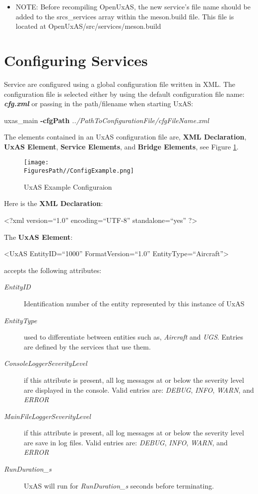 \begin{itemize}
\tightlist
\item
  NOTE: Before recompiling OpenUxAS, the new service's file name should
  be added to the srcs\_services array within the meson.build file. This
  file is located at OpenUxAS/src/services/meson.build
\end{itemize}

\section{Configuring Services}\label{configuring-services}

Service are configured using a global configuration file written in XML.
The configuration file is selected either by using the default
configuration file name: \textbf{\emph{cfg.xml}} or passing in the
path/filename when starting UxAS:

uxas\_main \textbf{-cfgPath}
\emph{../PathToConfigurationFile/cfgFileName.xml}

The elements contained in an UxAS configuration file are, \textbf{XML
Declaration}, \textbf{UxAS Element}, \textbf{Service Elements}, and
\textbf{Bridge Elements}, see Figure \ref{fig:configExample.png}.

\begin{figure}
\centering
\texttt{[image: \\FiguresPath//ConfigExample.png]}
\caption{UxAS Example Configuraion}
\label{fig:configExample.png}
\end{figure}

Here is the \textbf{XML Declaration}:

\textless{}?xml version=``1.0'' encoding=``UTF-8'' standalone=``yes''
?\textgreater{}

The \textbf{UxAS Element}:

\textless{}UxAS EntityID=``1000'' FormatVersion=``1.0''
EntityType=``Aircraft''\textgreater{}

accepts the following attributes:

\begin{description}
\item[\emph{EntityID}]
Identification number of the entity represented by this instance of UxAS
\item[\emph{EntityType}]
used to differentiate between entities such as, \emph{Aircraft} and
\emph{UGS}. Entries are defined by the services that use them.
\item[\emph{ConsoleLoggerSeverityLevel}]
if this attribute is present, all log messages at or below the severity
level are displayed in the console. Valid entries are: \emph{DEBUG},
\emph{INFO}, \emph{WARN}, and \emph{ERROR}
\item[\emph{MainFileLoggerSeverityLevel}]
if this attribute is present, all log messages at or below the severity
level are save in log files. Valid entries are: \emph{DEBUG},
\emph{INFO}, \emph{WARN}, and \emph{ERROR}
\item[\emph{RunDuration\_s}]
UxAS will run for \emph{RunDuration\_s} seconds before terminating.
\end{description}

